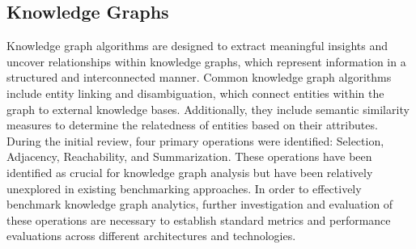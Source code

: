 \documentclass[letterpaper, 10pt]{article}
\begin{document}
\begin{multicols}{2}
        \subsection{Knowledge Graphs}\label{section:knowledgeGraphs}
            Knowledge graph algorithms are designed to extract meaningful insights and uncover relationships within knowledge graphs, which represent information in a structured and interconnected manner. Common knowledge graph algorithms include entity linking and disambiguation, which connect entities within the graph to external knowledge bases. Additionally, they include semantic similarity measures to determine the relatedness of entities based on their attributes. During the initial review, four primary operations were identified: Selection, Adjacency, Reachability, and Summarization. These operations have been identified as crucial for knowledge graph analysis but have been relatively unexplored in existing benchmarking approaches. In order to effectively benchmark knowledge graph analytics, further investigation and evaluation of these operations are necessary to establish standard metrics and performance evaluations across different architectures and technologies.
            

\end{multicols}
\end{document}
